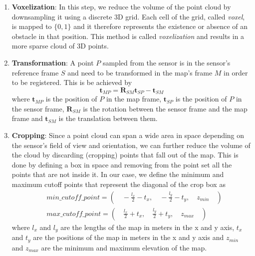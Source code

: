 \begin{enumerate}
    \item \textbf{Voxelization}:
        In this step, we reduce the volume of the point cloud by downsampling
        it using a discrete 3D grid.
        Each cell of the grid, called \textit{voxel}, is mapped to $\{0,1\}$
        and it therefore represents the existence or absence of an obstacle
        in that position.
        This method is called \textit{voxelization} and results in a more
        sparse cloud of 3D points.


    \item \textbf{Transformation}:
        A point $P$ sampled from the sensor is in the sensor's reference frame
        $S$ and need to be transformed in the map's frame $M$ in order to be
        registered.
        This is be achieved by
        \begin{equation}
            \mathbf{t}_{MP} =
                \mathbf{R}_{SM} \mathbf{t}_{SP} -
                \mathbf{t}_{SM}
        \end{equation}
        where
        $\mathbf{t}_{MP}$ is the position of $P$ in the map frame,
        $\mathbf{t}_{SP}$ is the position of $P$ in the sensor frame,
        $\mathbf{R}_{SM}$ is the rotation between the sensor frame and the
        map frame and
        $\mathbf{t}_{SM}$ is the translation between them.

    \item \textbf{Cropping}:
        Since a point cloud can span a wide area in space depending on the
        sensor's field of view and orientation, we can further reduce the
        volume of the cloud by discarding (cropping) points that fall out
        of the map.
        This is done by defining a box in space and removing
        from the point set all the points that are not inside it.
        In our case, we define the minimum and maximum cutoff points that
        represent the diagonal of the crop box as
        \begin{equation}
        \begin{aligned}
            &min\_cutoff\_point =
                \left( \quad
                    - \frac{l_x}{2} - t_x, \quad
                    - \frac{l_y}{2} - t_y, \quad
                    z_{min} \quad
                \right) \\
            &max\_cutoff\_point =
                \left( \quad
                    \frac{l_x}{2} + t_x, \quad
                    \frac{l_y}{2} + t_y, \quad
                    z_{max} \quad
                \right)
        \end{aligned}
        \end{equation}
        where
        $l_x$ and $l_y$ are the lengths of the map in meters in the
        x and y axis,
        $t_x$ and $t_y$ are the positions of the map in meters in the
        x and y axis and
        $z_{min}$ and $z_{max}$ are the minimum and maximum elevation
        of the map.


\end{enumerate}
